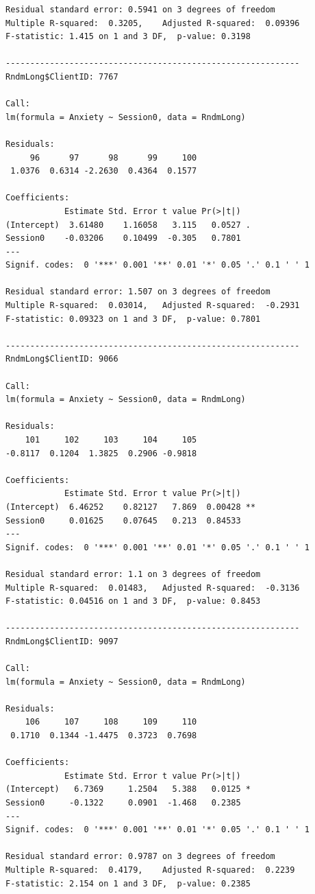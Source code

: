 \documentclass[
  english,
]{book}
\begin{document}
\begin{verbatim}
Residual standard error: 0.5941 on 3 degrees of freedom
Multiple R-squared:  0.3205,    Adjusted R-squared:  0.09396 
F-statistic: 1.415 on 1 and 3 DF,  p-value: 0.3198

------------------------------------------------------------ 
RndmLong$ClientID: 7767

Call:
lm(formula = Anxiety ~ Session0, data = RndmLong)

Residuals:
     96      97      98      99     100 
 1.0376  0.6314 -2.2630  0.4364  0.1577 

Coefficients:
            Estimate Std. Error t value Pr(>|t|)  
(Intercept)  3.61480    1.16058   3.115   0.0527 .
Session0    -0.03206    0.10499  -0.305   0.7801  
---
Signif. codes:  0 '***' 0.001 '**' 0.01 '*' 0.05 '.' 0.1 ' ' 1

Residual standard error: 1.507 on 3 degrees of freedom
Multiple R-squared:  0.03014,   Adjusted R-squared:  -0.2931 
F-statistic: 0.09323 on 1 and 3 DF,  p-value: 0.7801

------------------------------------------------------------ 
RndmLong$ClientID: 9066

Call:
lm(formula = Anxiety ~ Session0, data = RndmLong)

Residuals:
    101     102     103     104     105 
-0.8117  0.1204  1.3825  0.2906 -0.9818 

Coefficients:
            Estimate Std. Error t value Pr(>|t|)   
(Intercept)  6.46252    0.82127   7.869  0.00428 **
Session0     0.01625    0.07645   0.213  0.84533   
---
Signif. codes:  0 '***' 0.001 '**' 0.01 '*' 0.05 '.' 0.1 ' ' 1

Residual standard error: 1.1 on 3 degrees of freedom
Multiple R-squared:  0.01483,   Adjusted R-squared:  -0.3136 
F-statistic: 0.04516 on 1 and 3 DF,  p-value: 0.8453

------------------------------------------------------------ 
RndmLong$ClientID: 9097

Call:
lm(formula = Anxiety ~ Session0, data = RndmLong)

Residuals:
    106     107     108     109     110 
 0.1710  0.1344 -1.4475  0.3723  0.7698 

Coefficients:
            Estimate Std. Error t value Pr(>|t|)  
(Intercept)   6.7369     1.2504   5.388   0.0125 *
Session0     -0.1322     0.0901  -1.468   0.2385  
---
Signif. codes:  0 '***' 0.001 '**' 0.01 '*' 0.05 '.' 0.1 ' ' 1

Residual standard error: 0.9787 on 3 degrees of freedom
Multiple R-squared:  0.4179,    Adjusted R-squared:  0.2239 
F-statistic: 2.154 on 1 and 3 DF,  p-value: 0.2385


\end{verbatim}
\end{document}
